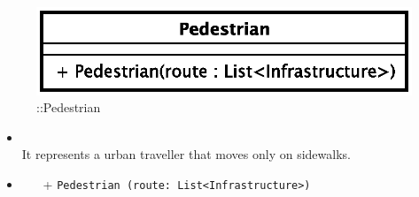\begin{figure}[h]
\centering
\includegraphics[scale=0.6,keepaspectratio]{images/solution/app/backend/pedestrian.eps}
\caption{\pActive::Pedestrian}
\label{fig:sd-app-pedestrian}
\end{figure}
\FloatBarrier
\begin{itemize}
  \item \textbf{\descr} \\
It represents a urban traveller that moves only on sidewalks.
\item \textbf{\ops}
  \begin{itemize}
    \item[+] \texttt{Pedestrian (route: List<Infrastructure>)}
  \end{itemize}
\end{itemize} 
